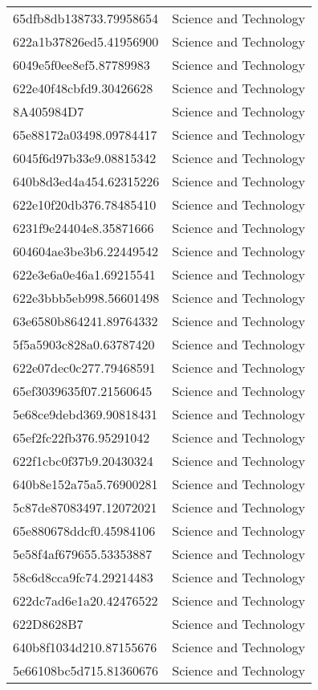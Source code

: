 \begin{tabular}{ll}
65dfb8db138733.79958654 & Science and Technology \\
622a1b37826ed5.41956900 & Science and Technology \\
6049e5f0ee8ef5.87789983 & Science and Technology \\
622e40f48cbfd9.30426628 & Science and Technology \\
8A405984D7 & Science and Technology \\
65e88172a03498.09784417 & Science and Technology \\
6045f6d97b33e9.08815342 & Science and Technology \\
640b8d3ed4a454.62315226 & Science and Technology \\
622e10f20db376.78485410 & Science and Technology \\
6231f9e24404e8.35871666 & Science and Technology \\
604604ae3be3b6.22449542 & Science and Technology \\
622e3e6a0e46a1.69215541 & Science and Technology \\
622e3bbb5eb998.56601498 & Science and Technology \\
63e6580b864241.89764332 & Science and Technology \\
5f5a5903c828a0.63787420 & Science and Technology \\
622e07dec0c277.79468591 & Science and Technology \\
65ef3039635f07.21560645 & Science and Technology \\
5e68ce9debd369.90818431 & Science and Technology \\
65ef2fc22fb376.95291042 & Science and Technology \\
622f1cbc0f37b9.20430324 & Science and Technology \\
640b8e152a75a5.76900281 & Science and Technology \\
5c87de87083497.12072021 & Science and Technology \\
65e880678ddcf0.45984106 & Science and Technology \\
5e58f4af679655.53353887 & Science and Technology \\
58c6d8cca9fc74.29214483 & Science and Technology \\
622dc7ad6e1a20.42476522 & Science and Technology \\
622D8628B7 & Science and Technology \\
640b8f1034d210.87155676 & Science and Technology \\
5e66108bc5d715.81360676 & Science and Technology \\

\end{tabular}
